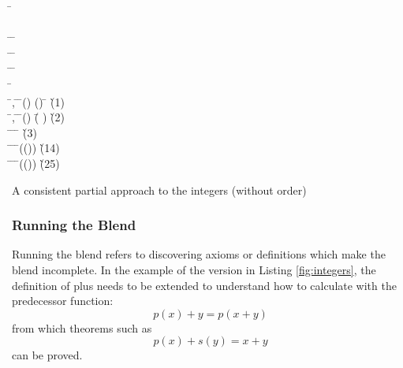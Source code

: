 \begin{listing}[!ht]
\begin{mdframed}
\begin{hetcasl}
\SPEC \= \Ax{=}\\
\> \SORT {}\\
\> \OP \=\Ax{\_\_}\Ax{+}\Ax{\_\_} \Ax{:} \= \Ax{\times}  \Ax{\rightarrow} \\
\> \OP \= \Ax{:} \= \Ax{\rightarrow} \\
\> \OP \= \Ax{:} \= \Ax{\rightarrow} \\
\> \OP \= \Ax{:} \\
\> \Ax{\forall} \=,  \Ax{:}  \=\Ax{\bullet} \=() \Ax{=} () \Ax{\Rightarrow} \= \Ax{=}  \`{\small{}\KW{\%}(1)\KW{\%}}\\
\> \Ax{\forall} \=,  \Ax{:}  \=\Ax{\bullet} \=() \Ax{+}  \Ax{=} (\= \Ax{+} ) \`{\small{}\KW{\%}(2)\KW{\%}}\\
\> \Ax{\forall} \= \Ax{:}  \=\Ax{\bullet} \= \Ax{+}  \Ax{=}  \`{\small{}\KW{\%}(3)\KW{\%}}\\
\> \Ax{\forall} \= \Ax{:}  \=\Ax{\bullet} \=(()) \Ax{=}  \`{\small{}\KW{\%}(1\Ax{\_}4)\KW{\%}}\\
\> \Ax{\forall} \= \Ax{:}  \=\Ax{\bullet} \=(()) \Ax{=}  \`{\small{}\KW{\%}(2\Ax{\_}5)\KW{\%}}\\
\end{hetcasl}
\end{mdframed}
\caption{A consistent partial approach to the integers (without order)}
\label{fig:integers}
\end{listing}

\subsubsection{Running the Blend}

Running the blend refers to discovering axioms or definitions which
make the blend incomplete. In the example of the version in Listing
\ref{fig:integers}, the definition of plus needs to be extended to
understand how to calculate with the predecessor function:
$$
p(x) + y = p(x+y)
$$
\noindent from which theorems such as 
$$
p(x) + s(y) = x+y
$$
\noindent can be proved.



